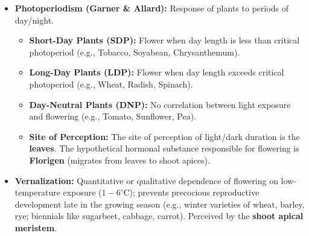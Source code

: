 \documentclass[10pt,a4paper]{article}
\begin{document}
\begin{ncertbox}
\begin{itemize}
  \item \textbf{Photoperiodism (Garner \& Allard):} Response of plants to periods of day/night.
  \begin{itemize}
    \item \textbf{Short-Day Plants (SDP):} Flower when day length is less than critical photoperiod (e.g., Tobacco, Soyabean, Chrysanthemum).
    \item \textbf{Long-Day Plants (LDP):} Flower when day length exceeds critical photoperiod (e.g., Wheat, Radish, Spinach).
    \item \textbf{Day-Neutral Plants (DNP):} No correlation between light exposure and flowering (e.g., Tomato, Sunflower, Pea).
    \item \textbf{Site of Perception:} The site of perception of light/dark duration is the \textbf{leaves}. The hypothetical hormonal substance responsible for flowering is \textbf{Florigen} (migrates from leaves to shoot apices).
  \end{itemize}
  \item \textbf{Vernalization:} Quantitative or qualitative dependence of flowering on low-temperature exposure ($1-6^\circ\mathrm{C}$); prevents precocious reproductive development late in the growing season (e.g., winter varieties of wheat, barley, rye; biennials like sugarbeet, cabbage, carrot). Perceived by the \textbf{shoot apical meristem}.
\end{itemize}
\end{ncertbox}
\end{document}
